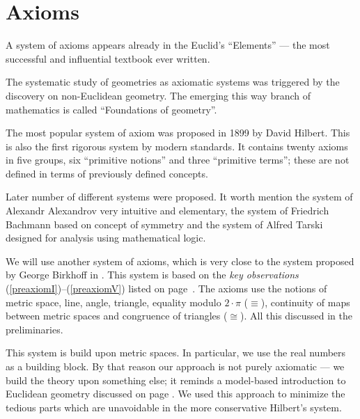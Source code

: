 \chapter{Axioms}
\label{chap:axioms}


\vfill

A system of axioms appears already in the Euclid's ``Elements'' --- the most successful and influential textbook ever written.

The systematic study of geometries as axiomatic systems
 was
triggered by the discovery on non-Euclidean geometry.
The emerging this way branch of mathematics is called ``Foundations of geometry''.

The most popular system of axiom
was proposed in 1899 by David Hilbert.
This is also the first rigorous system by modern standards.
It contains twenty axioms in five groups, six ``primitive notions'' and three ``primitive terms'';
these are not defined in terms of previously defined concepts.

Later number of different systems were proposed.
It worth mention
the system of Alexandr Alexandrov \cite{alexandrov} very intuitive and elementary, 
the system of Friedrich Bachmann \cite{bachmann} based on concept of symmetry
and the system of Alfred Tarski \cite{tarski} designed for analysis using mathematical logic.

We will use another system of axioms,
which is very close to the system proposed by George Birkhoff in \cite{birkhoff}.
This system is based on the \emph{key observations}  (\ref{preaxiomI})--(\ref{preaxiomV}) listed on page~\pageref{preaxiomI}.
The axioms use the notions of 
metric space, 
line, 
angle,
triangle,
equality modulo $2\cdot\pi$ ($\equiv$), 
continuity of maps between metric spaces
and congruence of triangles ($\cong$).
All this discussed in the preliminaries.

This system is build upon metric spaces.
In particular, we use the real numbers as a building block. 
By that reason our approach is not purely axiomatic --- we build the theory upon something else;
it reminds a model-based introduction to Euclidean geometry discussed on page \pageref{page:model}.
We used this approach to minimize the tedious parts which are unavoidable in the more conservative Hilbert's system.




